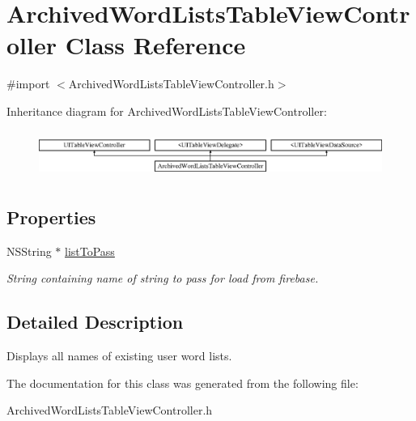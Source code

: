 \hypertarget{interface_archived_word_lists_table_view_controller}{\section{Archived\+Word\+Lists\+Table\+View\+Controller Class Reference}
\label{interface_archived_word_lists_table_view_controller}
}


{\ttfamily \#import $<$Archived\+Word\+Lists\+Table\+View\+Controller.\+h$>$}

Inheritance diagram for Archived\+Word\+Lists\+Table\+View\+Controller\+:\begin{figure}[H]
\begin{center}
\leavevmode
\includegraphics[height=1.542700cm]{interface_archived_word_lists_table_view_controller}
\end{center}
\end{figure}
\subsection*{Properties}
\begin{DoxyCompactItemize}
\item 
\hypertarget{interface_archived_word_lists_table_view_controller_a15e6031226bd7ed0877ee3b6946e16e9}{N\+S\+String $\ast$ \hyperlink{interface_archived_word_lists_table_view_controller_a15e6031226bd7ed0877ee3b6946e16e9}{list\+To\+Pass}}\label{interface_archived_word_lists_table_view_controller_a15e6031226bd7ed0877ee3b6946e16e9}

\begin{DoxyCompactList}\small\item\em String containing name of string to pass for load from firebase. \end{DoxyCompactList}\end{DoxyCompactItemize}


\subsection{Detailed Description}
Displays all names of existing user word lists. 

The documentation for this class was generated from the following file\+:\begin{DoxyCompactItemize}
\item 
Archived\+Word\+Lists\+Table\+View\+Controller.\+h\end{DoxyCompactItemize}
